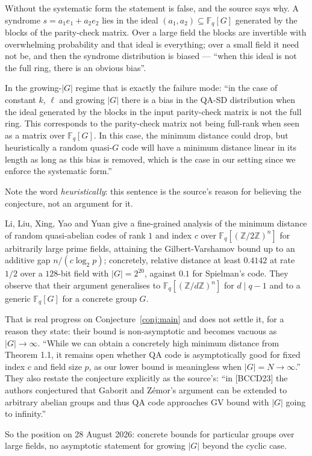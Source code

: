 \documentclass{aicr-conjecture}
\newcommand{\Fq}{\mathbb{F}_{q}}
\newcommand{\FqG}{\mathbb{F}_{q}[G]}
\begin{document}
\begin{remark}\label{rem:bias}
Without the systematic form the statement is false, and the source says
why. A syndrome $s = a_1 e_1 + a_2 e_2$ lies in the ideal
$(a_1, a_2) \subseteq \FqG$ generated by the blocks of the parity-check
matrix. Over a large field the blocks are invertible with overwhelming
probability and that ideal is everything; over a small field it need not
be, and then the syndrome distribution is biased --- ``when this ideal is
not the full ring, there is an obvious bias''.

In the growing-$|G|$ regime that is exactly the failure mode: ``in the
case of constant $k$, $\ell$ and growing $|G|$ there is a bias in the
QA-SD distribution when the ideal generated by the blocks in the input
parity-check matrix is not the full ring. This corresponds to the
parity-check matrix not being full-rank when seen as a matrix over
$\Fq[G]$. In this case, the minimum distance could drop, but heuristically
a random quasi-$G$ code will have a minimum distance linear in its length
as long as this bias is removed, which is the case in our setting since we
enforce the systematic form.''

Note the word \emph{heuristically}: this sentence is the source's reason
for believing the conjecture, not an argument for it.
\end{remark}

\begin{remark}\label{rem:progress}
Li, Liu, Xing, Yao and Yuan give a fine-grained analysis of the minimum
distance of random quasi-abelian codes of rank $1$ and index $c$ over
$\Fq[(\mathbb{Z}/2\mathbb{Z})^{n}]$ for arbitrarily large prime fields,
attaining the Gilbert-Varshamov bound up to an additive gap
$n/(c\log_2 p)$; concretely, relative distance at least $0.4142$ at rate
$1/2$ over a $128$-bit field with $|G| = 2^{20}$, against $0.1$ for
Spielman's code. They observe that their argument generalises to
$\Fq[(\mathbb{Z}/d\mathbb{Z})^{n}]$ for $d \mid q-1$ and to a generic
$\Fq[G]$ for a concrete group $G$.

That is real progress on Conjecture~\ref{conj:main} and does not settle
it, for a reason they state: their bound is non-asymptotic and becomes
vacuous as $|G| \to \infty$. ``While we can obtain a concretely high
minimum distance from Theorem 1.1, it remains open whether QA code is
asymptotically good for fixed index $c$ and field size $p$, as our lower
bound is meaningless when $|G| = N \to \infty$.'' They also restate the
conjecture explicitly as the source's: ``in [BCCD23] the authors
conjectured that Gaborit and Z\'emor's argument can be extended to
arbitrary abelian groups and thus QA code approaches GV bound with $|G|$
going to infinity.''

So the position on 28 August 2026: concrete bounds for particular groups
over large fields, no asymptotic statement for growing $|G|$ beyond the
cyclic case.
\end{remark}
\end{document}
